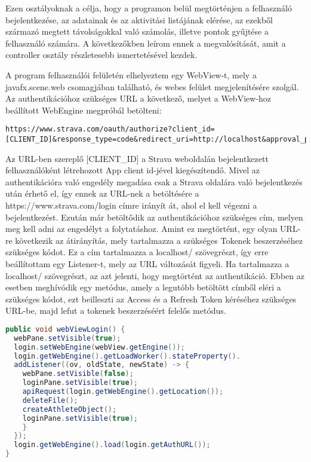 Ezen osztályoknak a célja, hogy a programon belül megtörténjen a felhasználó bejelentkezése, az adatainak és az aktivitási listájának elérése, az ezekből származó megtett távolságokkal való számolás, illetve pontok gyűjtése a felhasználó számára. A következőkben leírom ennek a megvalósítását, amit a controller osztály részletesebb ismertetésével kezdek. 

A program felhasználói felületén elhelyeztem egy WebView-t, mely a javafx.scene.web csomagjában található, és webes felület megjelenítésére szolgál. Az authentikációhoz szükséges URL a következő, melyet a WebView-hoz beállított WebEngine megpróbál betölteni: 

\begin{verbatim}
https://www.strava.com/oauth/authorize?client_id=[CLIENT_ID]&response_type=code&redirect_uri=http://localhost&approval_prompt=force&scope=activity:read_all 
\end{verbatim}





Az URL-ben szereplő [CLIENT\_ID] a Strava weboldalán bejelentkezett felhasználóként létrehozott App client id-jével kiegészítendő. Mivel az authentikációra való engedély megadása csak a Strava oldalára való bejelentkezés után érhető el, így ennek az URL-nek a betöltésére a https://www.strava.com/login címre irányít át, ahol el kell végezni a bejelentkezést. Ezután már betöltődik az authentikációhoz szükséges cím, melyen meg kell adni az engedélyt a folytatáshoz. Amint ez megtörtént, egy olyan URL-re következik az átirányítás, mely tartalmazza a szükséges Tokenek beszerzéséhez szükséges kódot. Ez a cím tartalmazza a localhost/ szövegrészt, így erre beállítottam egy Listener-t, mely az URL változását figyeli. Ha tartalmazza a localhost/ szövegrészt, az azt jelenti, hogy megtörtént az authentikáció. Ebben az esetben meghívódik egy metódus, amely a legutóbb betöltött címből eléri a szükséges kódot, ezt beilleszti az Access és a Refresh Token kéréséhez szükséges URL-be, majd lefut a tokenek beszerzéséért felelős metódus. 

\begin{lstlisting}[language=Java]
public void webViewLogin() { 
  webPane.setVisible(true); 
  login.setWebEngine(webView.getEngine()); 
  login.getWebEngine().getLoadWorker().stateProperty(). 
  addListener((ov, oldState, newState) -> { 
    webPane.setVisible(false); 
    loginPane.setVisible(true); 
    apiRequest(login.getWebEngine().getLocation()); 
    deleteFile(); 
    createAthleteObject(); 
    loginPane.setVisible(true); 
    } 
  }); 
  login.getWebEngine().load(login.getAuthURL()); 
} 
\end{lstlisting}
 

